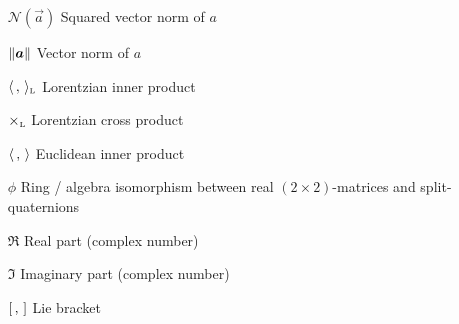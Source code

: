 \begin{itemize}[itemsep=0pt, leftmargin=3.4cm, labelsep=0cm, labelwidth=3.3cm, align=left]
    \item[$\mathscr{N}(\vec{a})$]  Squared vector norm of $a$
    \item[$\norm{\vec{a}}$]  Vector norm of $a$
    \item[$\langle \,,\, \rangle_\text{\tiny{L}}$]  Lorentzian inner product
    \item[$\times_\text{\tiny{L}} $]  Lorentzian cross product
    \item[$\langle \,,\, \rangle$]  Euclidean inner product
    \item[$\phi$]  Ring / algebra isomorphism between real $(2\times 2)$-matrices and split-quaternions
    \item[$\Re$]  Real part (complex number)
    \item[$\Im$]  Imaginary part (complex number)
    \item[$\qty[\,,\,]$]  Lie bracket
\end{itemize}